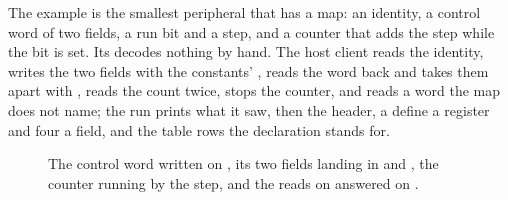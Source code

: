 The example is the smallest peripheral that has a map: an identity, a
control word of two fields, a run bit and a step, and a counter that
adds the step while the bit is set. Its  decodes nothing by
hand. The host client reads the identity, writes the two fields with
the constants' , reads the word back and takes them apart
with , reads the count twice, stops the counter, and reads
a word the map does not name; the run prints what it saw, then the
header, a define a register and four a field, and the table rows the
declaration stands for.

\begin{figure}[htbp]
\centering

\caption{The control word written on , its two fields
landing in  and , the counter running by the
step, and the reads on  answered on .}
\label{fig:x-regmap}
\end{figure}




